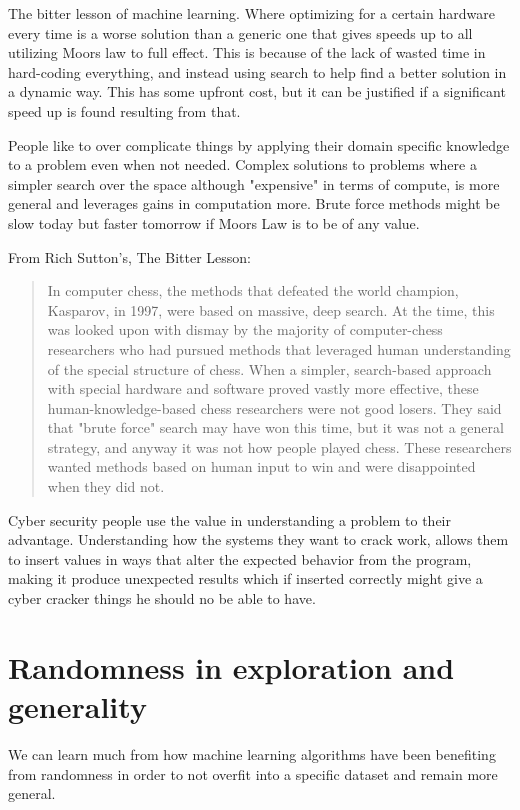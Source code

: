 \documentclass[a4paper]{article}
\begin{document}
The bitter lesson of machine learning. Where optimizing for a certain hardware every time is a worse solution than a generic one that gives speeds up to all utilizing Moors law to full effect. This is because of the lack of wasted time in hard-coding everything, and instead using search to help find a better solution in a dynamic way. This has some upfront cost, but it can be justified if a significant speed up is found resulting from that. 

People like to over complicate things by applying their domain specific knowledge to a problem 
even when not needed. 
Complex solutions to problems where a simpler search over the space 
although "expensive" in terms of compute, is more general and leverages gains in computation 
more. Brute force methods might be slow today but faster tomorrow if Moors Law is to be of 
any value.

From Rich Sutton's, The Bitter Lesson:
\begin{quotation}
In computer chess, the methods that defeated the world champion, Kasparov, in 1997, were based on massive, deep search. At the time, this was looked upon with dismay by the majority of computer-chess researchers who had pursued methods that leveraged human understanding of the special structure of chess. When a simpler, search-based approach with special hardware and software proved vastly more effective, these human-knowledge-based chess researchers were not good losers. They said that "brute force" search may have won this time, but it was not a general strategy, and anyway it was not how people played chess. These researchers wanted methods based on human input to win and were disappointed when they did not.
\end{quotation}


Cyber security people use the value in understanding a problem to their advantage. Understanding how the systems they want to crack work, allows them to insert values in ways that alter the expected behavior from the program, making it produce unexpected results which if inserted correctly might give a cyber cracker things he should no be able to have.  

\section{Randomness in exploration and generality}
We can learn much from how machine learning algorithms have been benefiting from randomness in order to not overfit into a specific dataset and remain more general.
\end{document}
